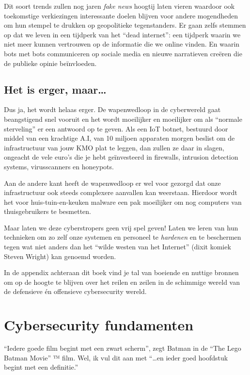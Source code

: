 \documentclass[
  10pt,
  dutch,
  paper=a4,
  ,captions=tableheading
]{scrbook}
\begin{document}
Dit soort trends zullen nog jaren \emph{fake news} hoogtij laten vieren
waardoor ook toekomstige verkiezingen interessante doelen blijven voor
andere mogendheden om hun stempel te drukken op geopolitieke
tegenstanders. Er gaan zelfs stemmen op dat we leven in een tijdperk van
het ``dead internet'': een tijdperk waarin we niet meer kunnen
vertrouwen op de informatie die we online vinden. En waarin bots met
bots communiceren op sociale media en nieuwe narratieven creëren die de
publieke opinie beïnvloeden.

\section{Het is erger, maar\ldots{}}\label{het-is-erger-maar}

Dus ja, het wordt helaas erger. De wapenwedloop in de cyberwereld gaat
beangstigend snel vooruit en het wordt moeilijker en moeilijker om als
``normale sterveling'' er een antwoord op te geven. Als een IoT botnet,
bestuurd door middel van een krachtige A.I, van 10 miljoen apparaten
morgen beslist om de infrastructuur van jouw KMO plat te leggen, dan
zullen ze daar in slagen, ongeacht de vele euro's die je hebt
geïnvesteerd in firewalls, intrusion detection systems, virusscanners en
honeypots.

Aan de andere kant heeft de wapenwedloop er wel voor gezorgd dat onze
infrastructuur ook steeds complexere aanvallen kan weerstaan. Hierdoor
wordt het voor huis-tuin-en-keuken malware een pak moeilijker om nog
computers van thuisgebruikers te besmetten.

Maar laten we deze cyberstropers geen vrij spel geven! Laten we leren
van hun technieken om zo zelf onze systemen en personeel te
\emph{hardenen} en te beschermen tegen wat niet anders dan het ``wilde
westen van het Internet'' (dixit komiek Steven Wright) kan genoemd
worden.

\begin{tipblock}
In de appendix achteraan dit boek vind je tal van boeiende en nuttige
bronnen om op de hoogte te blijven over het reilen en zeilen in de
schimmige wereld van de defensieve én offensieve cybersecurity wereld.
\end{tipblock}

\chapter{Cybersecurity fundamenten}\label{cybersecurity-fundamenten}

``Iedere goede film begint met een zwart scherm'', zegt Batman in de
``The Lego Batman Movie'' ™ film. Wel, ik vul dit aan met ``\ldots en
ieder goed hoofdstuk begint met een definitie.''
\end{document}
